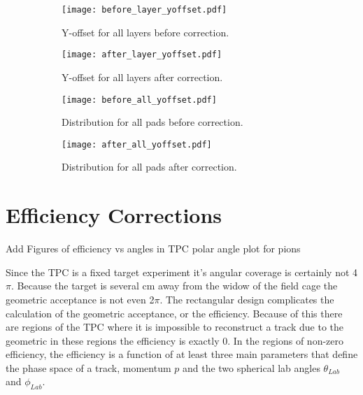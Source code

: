\begin{figure}[!htb]
    \centering
    \begin{subfigure}[t]{0.49\textwidth}
        \centering
        \texttt{[image: before\_layer\_yoffset.pdf]}
        \caption{Y-offset for all layers before correction.} \label{fig:yoff_beforeLayer}
    \end{subfigure}
    \hfill
    \begin{subfigure}[t]{.49\textwidth}
        \centering
        \texttt{[image: after\_layer\_yoffset.pdf]} 
        \caption{Y-offset for all layers after correction.} \label{fig:yoff_afterLayer}
    \end{subfigure}
     \hfill
    \begin{subfigure}[t]{.49\textwidth}
        \centering
        \texttt{[image: before\_all\_yoffset.pdf]} 
        \caption{Distribution for all pads before correction.} \label{fig:yoff_allBefore}
    \end{subfigure}
    \hfill
    \begin{subfigure}[t]{.49\textwidth}
        \centering
        \texttt{[image: after\_all\_yoffset.pdf]} 
        \caption{Distribution for all pads after correction.} \label{fig:yoff_allAfter}
    \end{subfigure}
    \caption{ }
\label{fig:yoff}
\end{figure}



\section{Efficiency Corrections}
\label{sec:efficiency}
Add Figures of efficiency vs angles in TPC polar angle plot for pions


Since the \spirit TPC is a fixed target experiment it's angular coverage is certainly not 4$\pi$. Because the target is several cm away from the widow of the field cage the geometric acceptance is not even 2$\pi$. The rectangular design complicates the calculation of the geometric acceptance, or the efficiency. Because of this there are regions of the TPC where it is impossible to reconstruct a track due to the geometric in these regions the efficiency is exactly 0. In the regions of non-zero efficiency, the efficiency is a function of at least three main parameters that define the phase space of a track, momentum $p$ and the two spherical lab angles $\theta_{Lab}$ and $\phi_{Lab}$. 

